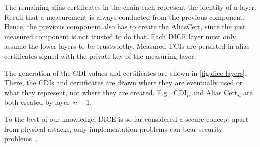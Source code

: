 
The remaining alias certificates in the chain each represent the identity of a layer.
Recall that a measurement is always conducted from the previous component. Hence, the previous component also has to create the AliasCert, since the just measured component is not trusted to do that. Each DICE layer must only assume the lower layers to be trustworthy.
Measured TCIs are persisted in alias certificates signed with the private key of the measuring layer.




The generation of the CDI values and certificates are shown in \autoref{fig:dice-layers}.
There, the CDIs and certificates are drawn where they are eventually used or what they represent, not where they are created.
E.g., CDI\textsubscript{\(n\)} and Alias Cert\textsubscript{\(n\)} are both created by layer~\(n-1\).


To the best of our knowledge, \ac{DICE} is so far considered a secure concept apart from physical attacks, only implementation problems can bear security problems~\cite{Jaeger2020, Hristozov2022}.

